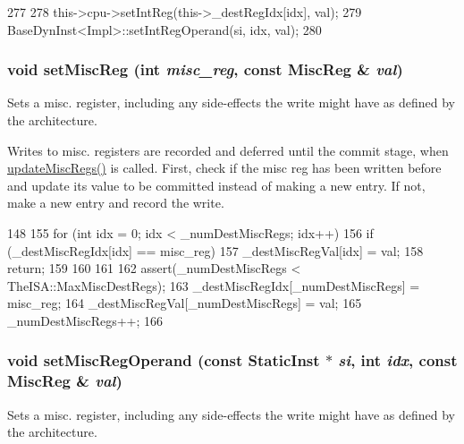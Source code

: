 \begin{DoxyCode}
277     {
278         this->cpu->setIntReg(this->_destRegIdx[idx], val);
279         BaseDynInst<Impl>::setIntRegOperand(si, idx, val);
280     }
\end{DoxyCode}
\hypertarget{classBaseO3DynInst_a1877dde4f3eb17a8b7d33ea40176c148}{
\subsubsection[{setMiscReg}]{\setlength{\rightskip}{0pt plus 5cm}void setMiscReg (int {\em misc\_\-reg}, \/  const {\bf MiscReg} \& {\em val})}}
\label{classBaseO3DynInst_a1877dde4f3eb17a8b7d33ea40176c148}
Sets a misc. register, including any side-\/effects the write might have as defined by the architecture. 

Writes to misc. registers are recorded and deferred until the commit stage, when \hyperlink{classBaseO3DynInst_a56cd11ccc7171772c548bcb4b959ef61}{updateMiscRegs()} is called. First, check if the misc reg has been written before and update its value to be committed instead of making a new entry. If not, make a new entry and record the write.


\begin{DoxyCode}
148     {
155         for (int idx = 0; idx < _numDestMiscRegs; idx++) {
156             if (_destMiscRegIdx[idx] == misc_reg) {
157                _destMiscRegVal[idx] = val;
158                return;
159             }
160         }
161 
162         assert(_numDestMiscRegs < TheISA::MaxMiscDestRegs);
163         _destMiscRegIdx[_numDestMiscRegs] = misc_reg;
164         _destMiscRegVal[_numDestMiscRegs] = val;
165         _numDestMiscRegs++;
166     }
\end{DoxyCode}
\hypertarget{classBaseO3DynInst_a6cfad8f780bab7feb893941cb0d46160}{
\subsubsection[{setMiscRegOperand}]{\setlength{\rightskip}{0pt plus 5cm}void setMiscRegOperand (const {\bf StaticInst} $\ast$ {\em si}, \/  int {\em idx}, \/  const {\bf MiscReg} \& {\em val})}}
\label{classBaseO3DynInst_a6cfad8f780bab7feb893941cb0d46160}
Sets a misc. register, including any side-\/effects the write might have as defined by the architecture. 



